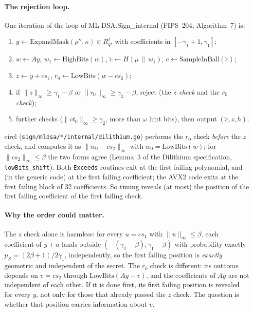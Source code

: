 \documentclass[11pt]{article}
\theoremstyle{definition}
\theoremstyle{remark}
\newcommand{\Rq}{R_q}
\newcommand{\lean}[1]{\texttt{#1}}
\begin{document}
\paragraph{The rejection loop.}
One iteration of the loop of ML-DSA.Sign\_internal (FIPS~204, Algorithm~7) is:
\begin{enumerate}
  \item $y \gets \mathrm{ExpandMask}(\rho'', \kappa) \in \Rq^\ell$, with coefficients in
        $[-\gamma_1+1,\gamma_1]$;
  \item $w \gets Ay$, $w_1 \gets \mathrm{HighBits}(w)$, $\tilde c \gets H(\mu \,\|\, w_1)$,
        $c \gets \mathrm{SampleInBall}(\tilde c)$;
  \item $z \gets y + cs_1$, $r_0 \gets \mathrm{LowBits}(w - cs_2)$;
  \item if $\|z\|_\infty \ge \gamma_1-\beta$ or $\|r_0\|_\infty \ge \gamma_2-\beta$, reject
        (the \emph{$z$ check} and the \emph{$r_0$ check});
  \item further checks ($\|ct_0\|_\infty \ge \gamma_2$, more than $\omega$ hint bits), then output
        $(\tilde c, z, h)$.
\end{enumerate}
circl (\texttt{sign/mldsa/*/internal/dilithium.go}) performs the $r_0$ check \emph{before} the
$z$ check, and computes it as $\|w_0 - cs_2\|_\infty$ with $w_0 = \mathrm{LowBits}(w)$; for
$\|cs_2\|_\infty\le\beta$ the two forms agree (Lemma~3 of the Dilithium specification,
\lean{lowBits\_shift}). Both \texttt{Exceeds} routines exit at the first failing polynomial, and
(in the generic code) at the first failing coefficient; the AVX2 code exits at the first failing
block of 32 coefficients. So timing reveals (at most) the position of the first failing
coefficient of the first failing check.

\paragraph{Why the order could matter.}
The $z$ check alone is harmless: for every $u = cs_1$ with $\|u\|_\infty\le\beta$, each
coefficient of $y+u$ lands outside $(-(\gamma_1-\beta), \gamma_1-\beta)$ with probability exactly
$p_Z = (2\beta+1)/2\gamma_1$, independently, so the first failing position is \emph{exactly}
geometric and independent of the secret. The $r_0$ check is different: its outcome depends on
$v = cs_2$ through $\mathrm{LowBits}(Ay - v)$, and the coefficients of $Ay$ are not independent of
each other. If it is done first, its first failing position is revealed for every $y$, not only
for those that already passed the $z$ check. The question is whether that position carries
information about $v$.
\end{document}
